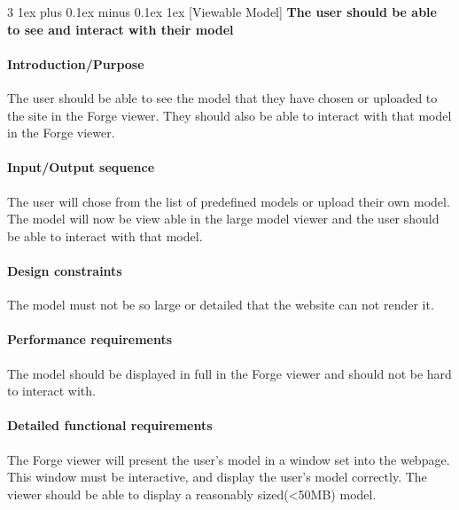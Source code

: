 \documentclass[letterpaper, 10pt, draftclsnofoot, compsoc, onecolumn]{IEEEtran}
\makeatletter
\def\subsubsection{\@startsection{subsubsection}%
                                 {3}%
                                 {\z@}%
                                 {1ex plus 0.1ex minus 0.1ex}%
                                 {1ex}%
                                 {\normalfont\normalsize}}%
\makeatother
\begin{document}

\subsubsection[{Viewable Model}]{\rmfamily\bfseries\color{black}
	The user should be able to see and interact with their model
}

\paragraph[Introduction/Purpose of this
feature]{\rmfamily\bfseries\color{black}
Introduction/Purpose }
	The user should be able to see the model that they have chosen or uploaded to the site in the Forge viewer. They 
	should also be able to interact with that model in the Forge viewer. 

\paragraph[Input/Output sequence for this
feature]{\rmfamily\bfseries\color{black}
Input/Output sequence }
	The user will chose from the list of predefined models or upload their own model. The model will now be view able in the large 
	model viewer and the user should be able to interact with that model.

\paragraph[Design constraints of this
feature]{\rmfamily\bfseries\color{black} Design constraints }
	The model must not be so large or detailed that the website can not render it.


\paragraph[Performance requirements of this
feature]{\rmfamily\bfseries\color{black}
Performance requirements }
	The model should be displayed in full in the Forge viewer and should not be hard to interact with. 

\paragraph[Detailed functional requirements of this
feature]{\rmfamily\bfseries\color{black}
Detailed functional requirements }
	The Forge viewer will present the user's model in a window set into the webpage. This window must be interactive, and display the 
	user's model correctly. The viewer should be able to display a reasonably sized(<50MB) model. 
\end{document}
